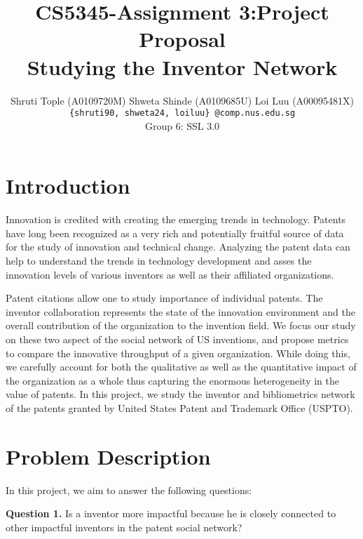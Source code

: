 \documentclass[11pt]{article}
\renewcommand{\paragraph}{\vspace{3pt}\noindent\textbf}
\begin{document}
\title{
\vspace{-6ex}
\textbf{CS5345-Assignment 3:Project Proposal}
\\ Studying the Inventor Network \vspace{-0.4cm}}
\author{Shruti Tople {\footnotesize (A0109720M)} \qquad Shweta Shinde {\footnotesize(A0109685U)} \qquad Loi Luu {\footnotesize(A00095481X)}\\ \texttt{\{shruti90, shweta24, loiluu\}~@comp.nus.edu.sg} \\
Group 6: SSL 3.0
}
\date{}

\maketitle
\pagestyle{empty}
\thispagestyle{empty}

\section{Introduction}

Innovation is credited with creating the emerging trends in technology. Patents have long been recognized as a very rich and potentially fruitful source of data for the study of innovation and technical change. Analyzing the patent data can help to understand the trends in technology development and asses the innovation levels of various inventors as well as their affiliated organizations. 

Patent citations allow one to study importance of individual patents. The inventor collaboration represents the state of the innovation environment and the overall contribution of the organization to the invention field. We focus our study on these two aspect of the social network of US inventions, and propose metrics to compare the innovative throughput of a given organization. While doing this, we carefully account for both the qualitative as well as the quantitative impact of the organization as a whole thus capturing the enormous heterogeneity in the value of patents. In this project, we study the inventor and bibliometrics network of the patents granted by United States Patent and Trademark Office (USPTO).

\section{Problem Description} 
In this project, we aim to answer the following questions:

\paragraph{Question 1.} Is a inventor more impactful because he is closely connected to other impactful inventors in the patent social network? %
\end{document}
